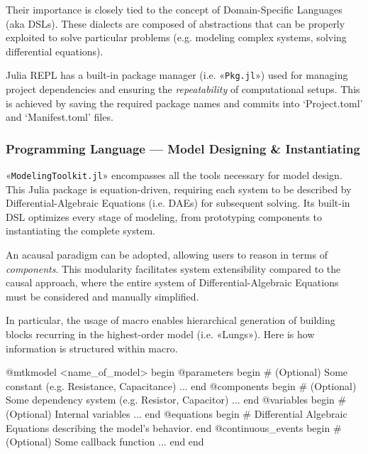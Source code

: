 Their importance is closely tied to the concept of Domain-Specific
Languages (aka DSLs).  These dialects are composed of abstractions
that can be properly exploited to solve particular problems
(e.g. modeling complex systems, solving differential equations).

Julia REPL has a built-in package manager (i.e. «\texttt{Pkg.jl}»)
used for managing project dependencies and ensuring the
\emph{repeatability} of computational setups.  This is achieved by
saving the required package names and commits into `Project.toml' and
`Manifest.toml' files.

\subsubsection{Programming Language --- Model Designing \& Instantiating}
\label{subsubsec:modelingtoolkit}

«\texttt{ModelingToolkit.jl}» encompasses all the tools necessary for
model design.  This Julia package is equation-driven, requiring each
system to be described by Differential-Algebraic Equations (i.e. DAEs)
for subsequent solving\cite{ma2021}. Its built-in DSL optimizes every
stage of modeling, from prototyping components to instantiating the
complete system.

An acausal paradigm can be adopted, allowing users to reason in terms
of \emph{components}\cite{mtkdocs2024}. This modularity facilitates
system extensibility compared to the causal approach, where the entire
system of Differential-Algebraic Equations must be considered and
manually simplified\cite{ma2024}.

In particular, the usage of  macro enables
hierarchical generation of building blocks recurring in the
highest-order model (i.e. «Lungs»).  Here is how information is
structured within  macro.

\begin{jllisting}[label=@mtkmodel, caption={\jlinl{@mtkmodel}: a macro for systems prototyping.}]
  @mtkmodel <name_of_model> begin
      @parameters begin
          # (Optional) Some constant (e.g. Resistance, Capacitance) ...
      end
      @components begin
          # (Optional) Some dependency system (e.g. Resistor, Capacitor) ...
      end
      @variables begin
          # (Optional) Internal variables ...
      end
      @equations begin
          # Differential Algebraic Equations describing the model's behavior.
      end
      @continuous_events begin
          # (Optional) Some callback function ...
      end
  end
\end{jllisting}

